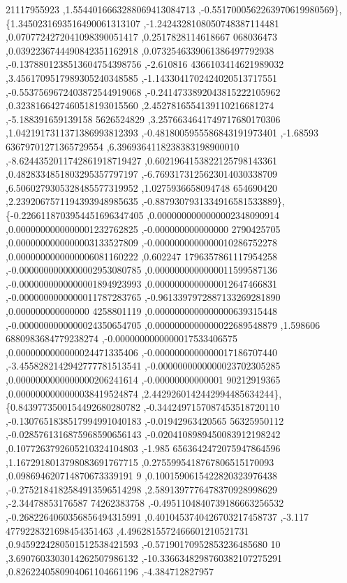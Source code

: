 \begin{DoxyCode}
      21117955923 ,1.5544016663288069413084713 ,-0.5517000562263970619980569\},
\{1.3450231693516490061313107 ,-1.2424328108050748387114481 ,0.0707724272041098390051417 ,0.2517828114618667
      068036473 ,0.0392236744490842351162918 ,0.0732546339061386497792938 ,-0.1378801238513604754398756 ,-2.610816
      4366103414621989032 ,3.4561709517989305240348585 ,-1.1433041702424020513717551 ,-0.5537569672403872544919068
       ,-0.2414733892043815222105962 ,0.3238166427460518193015560 ,2.4527816554139110216681274 ,-5.188391659139158
      5626524829 ,3.2576634641749717680170306 ,1.0421917311371386993812393 ,-0.4818005955586843191973401 ,-1.68593
      63679701271365729554 ,6.3969364118238383198900010 ,-8.6244352011742861918719427 ,0.6021964153822125798143361
       ,0.4828334851803295357797197 ,-6.7693173125623014030338709 ,6.5060279305328485577319952 ,1.0275936658094748
      654690420 ,2.2392067571194393948985635 ,-0.8879307931334916581533889\},
\{-0.2266118703954451696347405 ,0.0000000000000002348090914 ,0.0000000000000001232762825 ,-0.000000000000000
      2790425705 ,0.0000000000000003133527809 ,-0.0000000000000010286752278 ,0.0000000000000006081160222 ,0.602247
      1796357861117954258 ,-0.0000000000000002953080785 ,0.0000000000000011599587136 ,-0.0000000000000001894923993
       ,0.0000000000000012647466831 ,-0.0000000000000011787283765 ,-0.9613397972887133269281890 ,0.000000000000000
      4258801119 ,0.0000000000000000639315448 ,-0.0000000000000024350654705 ,0.0000000000000022689548879 ,1.598606
      6880983684779238274 ,-0.0000000000000017533406575 ,0.0000000000000024471335406 ,-0.0000000000000017186707440
       ,-3.4558282142942777781513541 ,-0.0000000000000023702305285 ,0.0000000000000000206241614 ,-0.00000000000001
      90212919365 ,0.0000000000000038419524874 ,2.4429260142442994485634244\},
\{0.8439773500154492680280782 ,-0.3442497157087453518720110 ,-0.1307651838517994991040183 ,-0.01942963420565
      56325950112 ,-0.0285761316875968590656143 ,-0.0204108989450083912198242 ,0.1077263792605210324104803 ,-1.985
      6563642472075947864596 ,1.1672918013798083691767715 ,0.2755995418767806515170093 ,0.098694620714870673339191
      9 ,0.1001590615422820323976438 ,-0.2752184182584913596514298 ,2.5891397776478370928998629 ,-2.34478853176587
      74262383758 ,-0.4951104840739186663256532 ,-0.2682264060356856494315991 ,0.4010453740426703217458737 ,-3.117
      4779228321698454351463 ,4.4962815572466601210521731 ,0.9459224280501512538421593 ,-0.57190170952853236485680
      10 ,3.6907603303014262507986132 ,-10.3366348298760382107275291 ,0.8262240580904061104661196 ,-4.384712827957

\end{DoxyCode}
